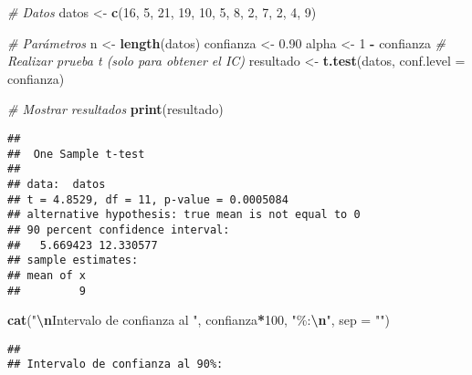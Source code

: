 \documentclass[
]{article}
\newenvironment{Shaded}{\begin{snugshade}}{\end{snugshade}}
\newcommand{\AttributeTok}[1]{\textcolor[rgb]{0.13,0.29,0.53}{#1}}
\newcommand{\CommentTok}[1]{\textcolor[rgb]{0.56,0.35,0.01}{\textit{#1}}}
\newcommand{\DecValTok}[1]{\textcolor[rgb]{0.00,0.00,0.81}{#1}}
\newcommand{\FloatTok}[1]{\textcolor[rgb]{0.00,0.00,0.81}{#1}}
\newcommand{\FunctionTok}[1]{\textcolor[rgb]{0.13,0.29,0.53}{\textbf{#1}}}
\newcommand{\NormalTok}[1]{#1}
\newcommand{\OtherTok}[1]{\textcolor[rgb]{0.56,0.35,0.01}{#1}}
\newcommand{\SpecialCharTok}[1]{\textcolor[rgb]{0.81,0.36,0.00}{\textbf{#1}}}
\newcommand{\StringTok}[1]{\textcolor[rgb]{0.31,0.60,0.02}{#1}}
\begin{document}
\begin{Shaded}
\begin{Highlighting}[]
\CommentTok{\# Datos}
\NormalTok{datos }\OtherTok{\textless{}{-}} \FunctionTok{c}\NormalTok{(}\DecValTok{16}\NormalTok{, }\DecValTok{5}\NormalTok{, }\DecValTok{21}\NormalTok{, }\DecValTok{19}\NormalTok{, }\DecValTok{10}\NormalTok{, }\DecValTok{5}\NormalTok{, }\DecValTok{8}\NormalTok{, }\DecValTok{2}\NormalTok{, }\DecValTok{7}\NormalTok{, }\DecValTok{2}\NormalTok{, }\DecValTok{4}\NormalTok{, }\DecValTok{9}\NormalTok{)}

\CommentTok{\# Parámetros}
\NormalTok{n }\OtherTok{\textless{}{-}} \FunctionTok{length}\NormalTok{(datos)}
\NormalTok{confianza }\OtherTok{\textless{}{-}} \FloatTok{0.90}
\NormalTok{alpha }\OtherTok{\textless{}{-}} \DecValTok{1} \SpecialCharTok{{-}}\NormalTok{ confianza}
\CommentTok{\# Realizar prueba t (solo para obtener el IC)}
\NormalTok{resultado }\OtherTok{\textless{}{-}} \FunctionTok{t.test}\NormalTok{(datos, }\AttributeTok{conf.level =}\NormalTok{ confianza)}

\CommentTok{\# Mostrar resultados}
\FunctionTok{print}\NormalTok{(resultado)}
\end{Highlighting}
\end{Shaded}

\begin{verbatim}
## 
##  One Sample t-test
## 
## data:  datos
## t = 4.8529, df = 11, p-value = 0.0005084
## alternative hypothesis: true mean is not equal to 0
## 90 percent confidence interval:
##   5.669423 12.330577
## sample estimates:
## mean of x 
##         9
\end{verbatim}

\begin{Shaded}
\begin{Highlighting}[]
\FunctionTok{cat}\NormalTok{(}\StringTok{"}\SpecialCharTok{\textbackslash{}n}\StringTok{Intervalo de confianza al "}\NormalTok{, confianza}\SpecialCharTok{*}\DecValTok{100}\NormalTok{, }\StringTok{"\%:}\SpecialCharTok{\textbackslash{}n}\StringTok{"}\NormalTok{, }\AttributeTok{sep =} \StringTok{""}\NormalTok{)}
\end{Highlighting}
\end{Shaded}

\begin{verbatim}
## 
## Intervalo de confianza al 90%:
\end{verbatim}

\begin{Shaded}
\end{Shaded}
\end{document}
